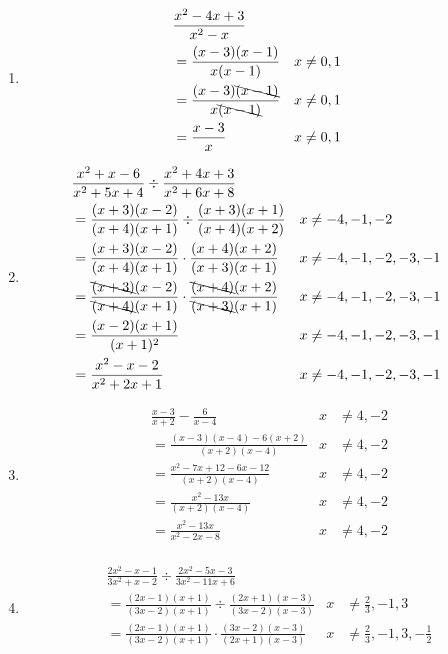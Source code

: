 \documentclass[paper=a4, fontsize=11pt]{scrartcl}
\begin{document}
\begin{enumerate}
\begin{enumerate}
        \item \begin{align*}
            &\frac{x^2-4x+3}{x^2-x}\\
            &=\frac{(x-3)(x-1)}{x(x-1)}&x&\neq0,1\\
            &=\frac{(x-3)\bcancel{(x-1)}}{x\bcancel{(x-1)}}&x&\neq0,1\\
            &=\frac{x-3}{x}&x&\neq0,1\\
        \end{align*}
        \item \begin{align*}
            &\frac{x^2+x-6}{x^2+5x+4}\div\frac{x^2+4x+3}{x^2+6x+8}\\
            &=\frac{(x+3)(x-2)}{(x+4)(x+1)}\div\frac{(x+3)(x+1)}{(x+4)(x+2)}&x&\neq-4,-1,-2\\
            &=\frac{(x+3)(x-2)}{(x+4)(x+1)}\cdot \frac{(x+4)(x+2)}{(x+3)(x+1)}&x&\neq-4,-1,-2,-3,-1\\
            &=\frac{\bcancel{(x+3)}(x-2)}{\bcancel{(x+4)}(x+1)}\cdot \frac{\bcancel{(x+4)}(x+2)}{\bcancel{(x+3)}(x+1)}&x&\neq-4,-1,-2,-3,-1\\
            &=\frac{(x-2)(x+1)}{(x+1)^2}&x&\neq-4,-1,-2,-3,-1\\
            &=\frac{x^2-x-2}{x^2+2x+1}&x&\neq-4,-1,-2,-3,-1\\
        \end{align*}
        \item \begin{align*}
            &\frac{x-3}{x+2}-\frac{6}{x-4}&x&\neq4,-2\\
            &=\frac{(x-3)(x-4)-6(x+2)}{(x+2)(x-4)}&x&\neq4,-2\\
            &=\frac{x^2-7x+12-6x-12}{(x+2)(x-4)}&x&\neq4,-2\\
            &=\frac{x^2-13x}{(x+2)(x-4)}&x&\neq4,-2\\
            &=\frac{x^2-13x}{x^2-2x-8}&x&\neq4,-2\\
        \end{align*}
        \item \begin{align*}
            &\frac{2x^2-x-1}{3x^2+x-2}\div\frac{2x^2-5x-3}{3x^2-11x+6}\\
            &=\frac{(2x-1)(x+1)}{(3x-2)(x+1)}\div\frac{(2x+1)(x-3)}{(3x-2)(x-3)}&x&\neq\frac{2}{3},-1,3\\
            &=\frac{(2x-1)(x+1)}{(3x-2)(x+1)}\cdot \frac{(3x-2)(x-3)}{(2x+1)(x-3)}&x&\neq\frac{2}{3},-1,3,-\frac{1}{2}\\

\end{align*}
\end{enumerate}
\end{enumerate}
\end{document}
